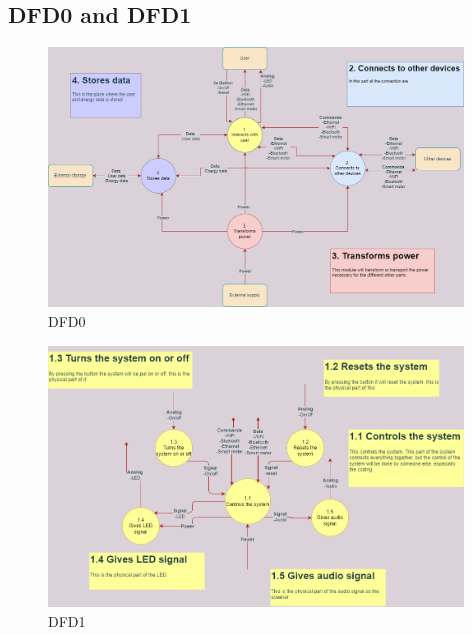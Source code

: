 \subsection{DFD0 and DFD1}
\begin{figure}[H]
    \centering
    \includegraphics[width=11cm]{Images/Architecture/DFD0.png}
    \caption{DFD0}
    \label{fig:DFD0}
\end{figure}

\begin{figure}[H]
    \centering
    \includegraphics[width=11cm]{Images/Architecture/DFD1.png}
    \caption{DFD1}
    \label{fig:DFD1}
\end{figure}

